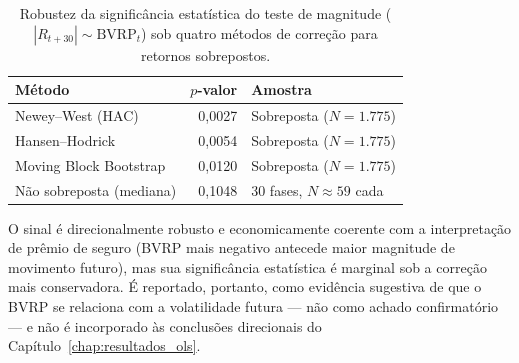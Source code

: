 \begin{table}[H]
\centering
\caption{Robustez da significância estatística do teste de magnitude
($|R_{t+30}| \sim \text{BVRP}_t$) sob quatro métodos de correção para
retornos sobrepostos.}
\label{tab:cap8-magnitude-robustez}
\begin{tabular}{lrl}
\toprule
Método & $p$-valor & Amostra \\
\midrule
Newey--West (HAC)          & 0{,}0027 & Sobreposta ($N=1.775$) \\
Hansen--Hodrick             & 0{,}0054 & Sobreposta ($N=1.775$) \\
Moving Block Bootstrap      & 0{,}0120 & Sobreposta ($N=1.775$) \\
Não sobreposta (mediana)    & 0{,}1048 & 30 fases, $N\approx59$ cada \\
\bottomrule
\end{tabular}
\end{table}

O sinal é direcionalmente robusto e economicamente coerente com a
interpretação de prêmio de seguro (BVRP mais negativo antecede maior
magnitude de movimento futuro), mas sua significância estatística é
marginal sob a correção mais conservadora. É reportado, portanto, como
evidência sugestiva de que o BVRP se relaciona com a volatilidade futura
--- não como achado confirmatório --- e não é incorporado às conclusões
direcionais do Capítulo~\ref{chap:resultados_ols}.
